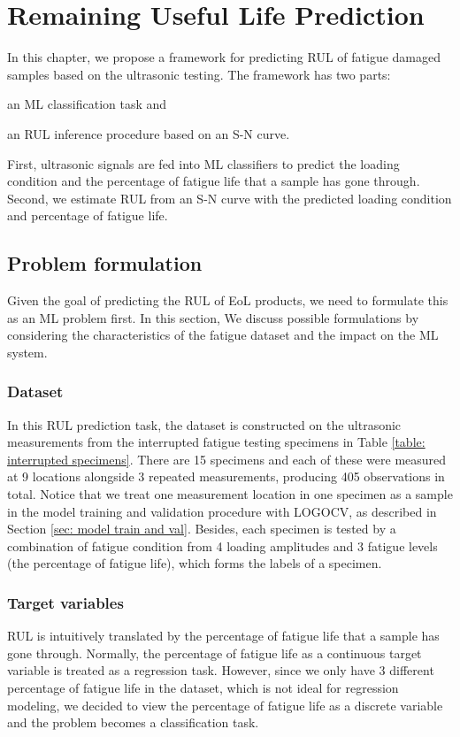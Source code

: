 \chapter{Remaining Useful Life Prediction}
\label{chap: rul}

In this chapter, we propose a framework for predicting RUL of fatigue damaged samples based on the ultrasonic testing. The framework has two parts: \begin{enumerate*}[label=\itshape\alph*\upshape)]
    \item an ML classification task and
    \item an RUL inference procedure based on an S-N curve.
\end{enumerate*}  First, ultrasonic signals are fed into ML classifiers to predict the loading condition and the percentage of fatigue life that a sample has gone through. Second, we estimate RUL from an S-N curve with the predicted loading condition and percentage of fatigue life.

\section{Problem formulation}
\label{sec: rul prob formulation}
Given the goal of predicting the RUL of EoL products, we need to formulate this as an ML problem first. In this section, We discuss possible formulations by considering the characteristics of the fatigue dataset and the impact on the ML system.

\subsection{Dataset}
In this RUL prediction task, the dataset is constructed on the ultrasonic measurements from the interrupted fatigue testing specimens in Table \ref{table: interrupted specimens}. There are 15 specimens and each of these were measured at 9 locations alongside 3 repeated measurements, producing 405 observations in total. Notice that we treat one measurement location in one specimen as a sample in the model training and validation procedure with LOGOCV, as described in Section \ref{sec: model train and val}. Besides, each specimen is tested by a combination of fatigue condition from 4 loading amplitudes and 3 fatigue levels (the percentage of fatigue life), which forms the labels of a specimen.

\subsection{Target variables}
RUL is intuitively translated by the percentage of fatigue life that a sample has gone through. Normally, the percentage of fatigue life as a continuous target variable is treated as a regression task. However, since we only have 3 different percentage of fatigue life in the dataset, which is not ideal for regression modeling, we decided to view the percentage of fatigue life as a discrete variable and the problem becomes a classification task.

